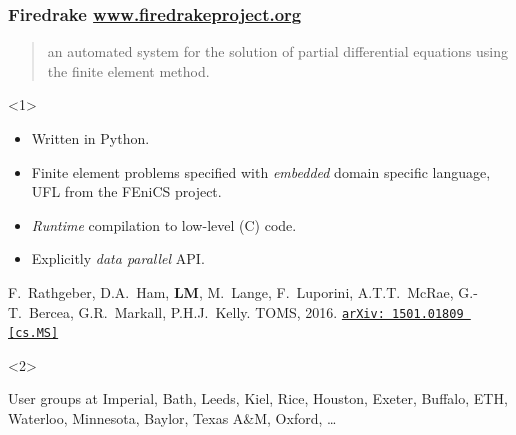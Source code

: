 \documentclass[presentation]{beamer}
\newcommand{\arxivlink}[2]{%
  \href{http://www.arxiv.org/abs/#1}%
  {\texttt{arXiv:\,#1\,[#2]}}%
}
\begin{document}
\begin{frame}
  \frametitle{Firedrake \url{www.firedrakeproject.org}}

  \begin{quote}
    {\normalfont [\ldots]} an automated system for the solution of partial
    differential equations using the finite element method.
  \end{quote}

  \begin{onlyenv}<1>
    \begin{itemize}
    \item Written in Python.
    \item Finite element problems specified with \emph{embedded}
      domain specific language, UFL \parencite{Alnaes:2014} from the
      FEniCS project.
    \item \emph{Runtime} compilation to low-level (C) code.
    \item Explicitly \emph{data parallel} API.
    \end{itemize}

    \begin{flushright}
      {\scriptsize F.~Rathgeber, D.A.~Ham, \textbf{LM}, M.~Lange,
        F.~Luporini, A.T.T.~McRae, G.-T.~Bercea, G.R.~Markall,
        P.H.J.~Kelly. TOMS,
        2016. \arxivlink{1501.01809}{cs.MS}\nocite{Rathgeber:2016}}
    \end{flushright}
  \end{onlyenv}
  \begin{onlyenv}<2>
    \begin{block}{User groups at}
      Imperial, Bath, Leeds, Kiel, Rice, Houston, Exeter, Buffalo,
      ETH, Waterloo, Minnesota, Baylor, Texas A\&M, Oxford, \dots
    \end{block}
  \end{onlyenv}
\end{frame}
\end{document}
